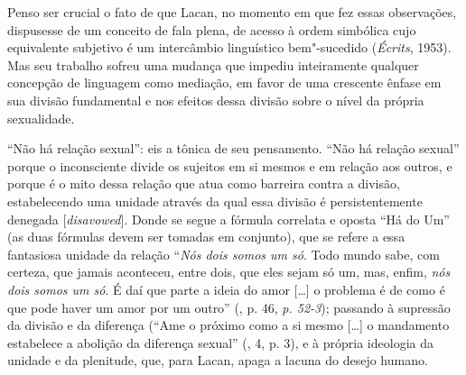 Penso ser crucial o fato de que Lacan, no momento em que fez essas
observações, dispusesse de um conceito de fala plena, de acesso à ordem
simbólica cujo equivalente subjetivo é um intercâmbio linguístico bem"-sucedido (\emph{Écrits}, 1953). Mas seu trabalho sofreu uma mudança
que impediu inteiramente qualquer concepção de linguagem como mediação,
em favor de uma crescente ênfase em sua divisão fundamental e nos
efeitos dessa divisão sobre o nível da própria sexualidade.

``Não há relação sexual'': eis a tônica de seu pensamento. ``Não há
relação sexual'' porque o inconsciente divide os sujeitos em si mesmos e
em relação aos outros, e porque é o mito dessa relação que atua como
barreira contra a divisão, estabelecendo uma unidade através da qual
essa divisão é persistentemente denegada {[}\emph{disavowed}{]}. Donde
se segue a fórmula correlata e oposta ``Há do Um'' (as duas fórmulas
devem ser tomadas em conjunto), que se refere a essa fantasiosa unidade
da relação ``\emph{Nós dois somos um só}. Todo mundo sabe, com certeza,
que jamais aconteceu, entre dois, que eles sejam só um, mas, enfim,
\emph{nós dois somos um só}. É daí que parte a ideia do amor {[}\ldots{}{]} o
problema é de como é que pode haver um amor por um outro'' (, p. 46,
\emph{p. 52-3}); passando à supressão da divisão e da diferença (``Ame
o próximo como a si mesmo {[}\ldots{}{]} o mandamento estabelece a abolição
da diferença sexual'' (, 4, p. 3), e à própria ideologia da unidade %
e da plenitude, que, para Lacan, apaga a lacuna do desejo humano.

